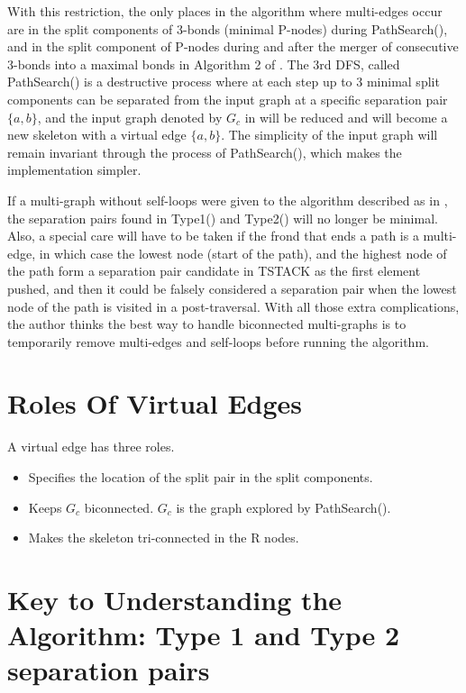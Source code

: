 \documentclass[twoside,twocolumn]{article}
\begin{document}
With this restriction, the only places in the algorithm where multi-edges
occur are in the split components of 3-bonds (minimal P-nodes) during
{\ttfamily PathSearch()}, and in the split component of P-nodes during and after the
merger of consecutive 3-bonds into a maximal bonds in Algorithm 2 of \cite{GM01}.
The 3rd DFS, called {\ttfamily PathSearch()} is a destructive process where at each step
up to 3 minimal split components can be separated from the input graph at
a specific separation pair $\{a,b\}$, and the input graph denoted by $G_c$ in \cite{GM01}
will be reduced and will become a new skeleton with a virtual edge $\{a,b\}$.
The simplicity of the input graph will remain invariant through the process
of {\ttfamily PathSearch()}, which  makes the implementation simpler.

If a multi-graph without self-loops were given to the algorithm described as in
\cite{GM01}, the separation pairs found in {\ttfamily Type1()} and {\ttfamily Type2()} will no longer be
minimal. Also, a special care will have to be taken if the frond that ends
a path is a multi-edge, in which case the lowest node (start of the path),
and the highest node of the path form a separation pair candidate in {\ttfamily TSTACK}
 as the first element pushed, and then it could be falsely considered a
separation pair when the lowest node of the path is visited in a
post-traversal.
With all those extra complications, the author thinks the best way to
handle biconnected multi-graphs is to temporarily remove multi-edges and
self-loops before running the algorithm.

\section{Roles Of Virtual Edges}
A virtual edge has three roles.
\begin{itemize}
\item Specifies the location of the split pair in the split components.
\item Keeps $G_c$ biconnected. $G_c$ is the graph explored by {\ttfamily PathSearch()}.
\item Makes the skeleton tri-connected in the R nodes.
\end{itemize}


\section{Key to Understanding the Algorithm: Type 1 and Type 2 separation pairs}
\end{document}
